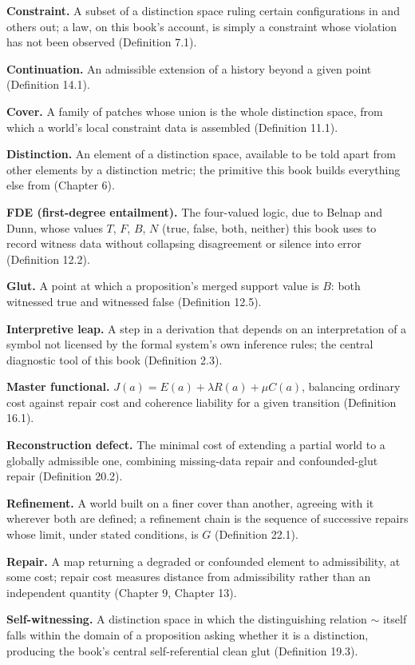 \documentclass[11pt]{book}
\begin{document}
\textbf{Constraint.} A subset of a distinction space ruling certain configurations in and others out; a law, on this book's account, is simply a constraint whose violation has not been observed (Definition 7.1).

\textbf{Continuation.} An admissible extension of a history beyond a given point (Definition 14.1).

\textbf{Cover.} A family of patches whose union is the whole distinction space, from which a world's local constraint data is assembled (Definition 11.1).

\textbf{Distinction.} An element of a distinction space, available to be told apart from other elements by a distinction metric; the primitive this book builds everything else from (Chapter 6).

\textbf{FDE (first-degree entailment).} The four-valued logic, due to Belnap and Dunn, whose values $T$, $F$, $B$, $N$ (true, false, both, neither) this book uses to record witness data without collapsing disagreement or silence into error (Definition 12.2).

\textbf{Glut.} A point at which a proposition's merged support value is $B$: both witnessed true and witnessed false (Definition 12.5).

\textbf{Interpretive leap.} A step in a derivation that depends on an interpretation of a symbol not licensed by the formal system's own inference rules; the central diagnostic tool of this book (Definition 2.3).

\textbf{Master functional.} $J(a) = E(a) + \lambda R(a) + \mu C(a)$, balancing ordinary cost against repair cost and coherence liability for a given transition (Definition 16.1).

\textbf{Reconstruction defect.} The minimal cost of extending a partial world to a globally admissible one, combining missing-data repair and confounded-glut repair (Definition 20.2).

\textbf{Refinement.} A world built on a finer cover than another, agreeing with it wherever both are defined; a refinement chain is the sequence of successive repairs whose limit, under stated conditions, is $G$ (Definition 22.1).

\textbf{Repair.} A map returning a degraded or confounded element to admissibility, at some cost; repair cost measures distance from admissibility rather than an independent quantity (Chapter 9, Chapter 13).

\textbf{Self-witnessing.} A distinction space in which the distinguishing relation $\sim$ itself falls within the domain of a proposition asking whether it is a distinction, producing the book's central self-referential clean glut (Definition 19.3).
\end{document}
